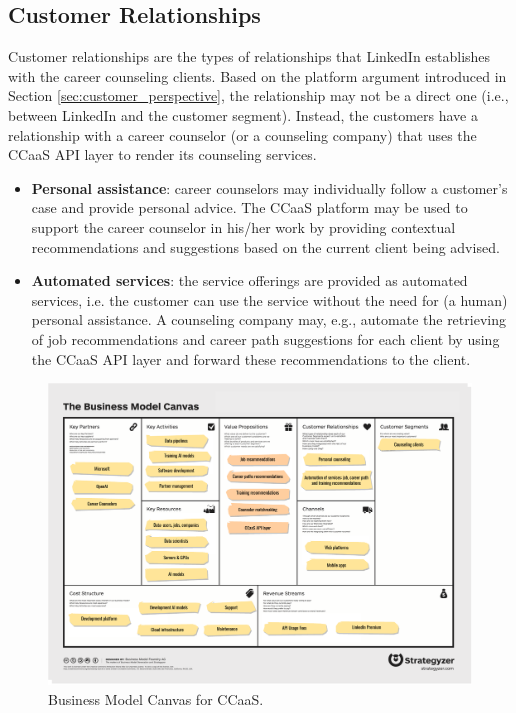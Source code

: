 \subsection{Customer Relationships}

Customer relationships are the types of relationships that LinkedIn establishes with the career
counseling clients. Based on the platform argument introduced in Section \ref{sec:customer_perspective},
the relationship may not be a direct one (i.e., between LinkedIn and the customer segment). Instead, 
the customers have a relationship with a career counselor (or a counseling company) that uses the
CCaaS API layer to render its counseling services.

\begin{itemize}
    \item \textbf{Personal assistance}: career counselors may individually follow a customer's case and 
            provide personal advice. The CCaaS platform may be used to support the career counselor
            in his/her work by providing contextual recommendations and suggestions based on the 
            current client being advised.
    \item \textbf{Automated services}: the service offerings are provided as automated services, i.e. 
            the customer can use the service without the need for (a human) personal assistance.
            A counseling company may, e.g., automate the retrieving of job recommendations and 
            career path suggestions for each client by using the CCaaS API layer and forward
            these recommendations to the client. 
\end{itemize}

\begin{landscape}
        \begin{figure}
                \centering
                \caption{Business Model Canvas for CCaaS.}
                \label{fig:bmc}
                \includegraphics[width=1.3\textwidth]{figures/bmc.pdf}
        \end{figure}
\end{landscape}

